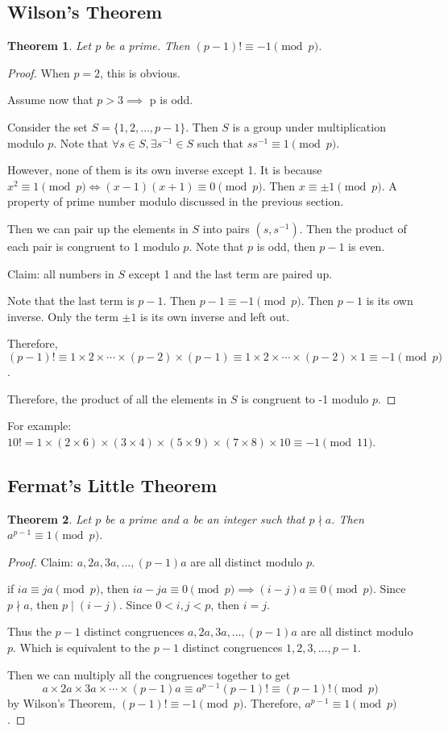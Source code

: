 \documentclass[letterpaper,12pt,oneside]{article}
\newtheorem{theorem}{Theorem}
\begin{document}
\subsection{Wilson's Theorem}
\begin{theorem}
    Let $p$ be a prime. Then $(p-1)!\equiv -1 \pmod p$.
\end{theorem}
\begin{proof}
    When $p=2$, this is obvious. 

    Assume now that $p>3\implies$ p is odd. 

    Consider the set $S=\{1,2,\ldots,p-1\}$. Then $S$ is a group under multiplication modulo $p$. Note that $\forall s \in S, \exists s^{-1} \in S$ such that $ss^{-1}\equiv 1 \pmod p$. 

    However, none of them is its own inverse except 1. It is because  $x^2\equiv 1 \pmod p \iff (x-1)(x+1)\equiv 0 \pmod p$. Then $x\equiv \pm 1 \pmod p$. A property of prime number modulo discussed in the previous section.

    Then we can pair up the elements in $S$ into pairs $(s,s^{-1})$. Then the product of each pair is congruent to 1 modulo $p$. Note that $p$ is odd, then $p-1$ is even. 

    Claim: all numbers in $S$ except 1 and the last term are paired up. 

    Note that the last term is $p-1$. Then $p-1\equiv -1 \pmod p$. Then $p-1$ is its own inverse. Only the term $\pm 1$ is its own inverse and left out.

    Therefore, $(p-1)!\equiv 1\times 2\times \cdots \times (p-2)\times (p-1) \equiv 1\times 2\times \cdots \times (p-2)\times 1 \equiv -1 \pmod p$.

     Therefore, the product of all the elements in $S$ is congruent to -1 modulo $p$.
\end{proof}
For example: $10!=1\times (2\times 6)\times (3 \times 4)\times (5\times 9)\times (7\times 8)\times 10\equiv -1 \pmod {11}$.
\subsection{Fermat's Little Theorem}
\begin{theorem}
    Let $p$ be a prime and $a$ be an integer such that $p\nmid a$. Then $a^{p-1}\equiv 1 \pmod p$.
\end{theorem}
\begin{proof}
    Claim: $a,2a,3a,\ldots,(p-1)a$ are all distinct modulo $p$.

    if $ia\equiv ja \pmod p$, then $ia-ja\equiv 0 \pmod p \implies (i-j)a\equiv 0 \pmod p$. Since $p\nmid a$, then $p\mid (i-j)$. Since $0<i,j<p$, then $i=j$.

    Thus the $p-1$ distinct congruences $a,2a,3a,\ldots,(p-1)a$ are all distinct modulo $p$. Which is equivalent to the $p-1$ distinct congruences $1,2,3,\ldots,p-1$.

    Then we can multiply all the congruences together to get \[
        a\times 2a\times 3a\times \cdots \times (p-1)a\equiv 
        a^{p-1}(p-1)!\equiv (p-1)!\pmod p
    \]
    by Wilson's Theorem, $(p-1)!\equiv -1 \pmod p$. Therefore, $a^{p-1}\equiv 1 \pmod p$.
\end{proof}
\end{document}
